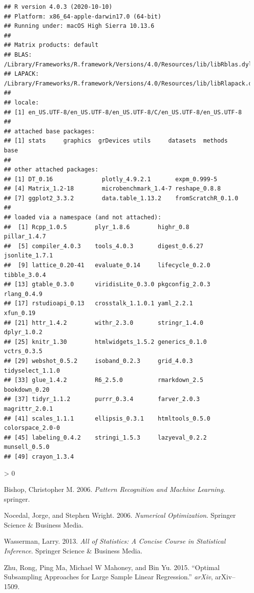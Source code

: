 \documentclass[
]{book}
\newlength{\cslhangindent}
\newenvironment{CSLReferences}[2] %
 {%
  \setlength{\parindent}{0pt}
  \ifodd #1 \everypar{\setlength{\hangindent}{\cslhangindent}}\ignorespaces\fi
  \ifnum #2 > 0
  \setlength{\parskip}{#2\baselineskip}
  \fi
 }%
 {}
\begin{document}
\begin{verbatim}
## R version 4.0.3 (2020-10-10)
## Platform: x86_64-apple-darwin17.0 (64-bit)
## Running under: macOS High Sierra 10.13.6
## 
## Matrix products: default
## BLAS:   /Library/Frameworks/R.framework/Versions/4.0/Resources/lib/libRblas.dylib
## LAPACK: /Library/Frameworks/R.framework/Versions/4.0/Resources/lib/libRlapack.dylib
## 
## locale:
## [1] en_US.UTF-8/en_US.UTF-8/en_US.UTF-8/C/en_US.UTF-8/en_US.UTF-8
## 
## attached base packages:
## [1] stats     graphics  grDevices utils     datasets  methods   base     
## 
## other attached packages:
## [1] DT_0.16              plotly_4.9.2.1       expm_0.999-5        
## [4] Matrix_1.2-18        microbenchmark_1.4-7 reshape_0.8.8       
## [7] ggplot2_3.3.2        data.table_1.13.2    fromScratchR_0.1.0  
## 
## loaded via a namespace (and not attached):
##  [1] Rcpp_1.0.5        plyr_1.8.6        highr_0.8         pillar_1.4.7     
##  [5] compiler_4.0.3    tools_4.0.3       digest_0.6.27     jsonlite_1.7.1   
##  [9] lattice_0.20-41   evaluate_0.14     lifecycle_0.2.0   tibble_3.0.4     
## [13] gtable_0.3.0      viridisLite_0.3.0 pkgconfig_2.0.3   rlang_0.4.9      
## [17] rstudioapi_0.13   crosstalk_1.1.0.1 yaml_2.2.1        xfun_0.19        
## [21] httr_1.4.2        withr_2.3.0       stringr_1.4.0     dplyr_1.0.2      
## [25] knitr_1.30        htmlwidgets_1.5.2 generics_0.1.0    vctrs_0.3.5      
## [29] webshot_0.5.2     isoband_0.2.3     grid_4.0.3        tidyselect_1.1.0 
## [33] glue_1.4.2        R6_2.5.0          rmarkdown_2.5     bookdown_0.20    
## [37] tidyr_1.1.2       purrr_0.3.4       farver_2.0.3      magrittr_2.0.1   
## [41] scales_1.1.1      ellipsis_0.3.1    htmltools_0.5.0   colorspace_2.0-0 
## [45] labeling_0.4.2    stringi_1.5.3     lazyeval_0.2.2    munsell_0.5.0    
## [49] crayon_1.3.4
\end{verbatim}

\hypertarget{refs}{}
\begin{CSLReferences}{1}{0}
\leavevmode\hypertarget{ref-bishop2006pattern}{}%
Bishop, Christopher M. 2006. \emph{Pattern Recognition and Machine Learning}. springer.

\leavevmode\hypertarget{ref-nw2006numerical}{}%
Nocedal, Jorge, and Stephen Wright. 2006. \emph{Numerical Optimization}. Springer Science \& Business Media.

\leavevmode\hypertarget{ref-wasserman2013all}{}%
Wasserman, Larry. 2013. \emph{All of Statistics: A Concise Course in Statistical Inference}. Springer Science \& Business Media.

\leavevmode\hypertarget{ref-zhu2015optimal}{}%
Zhu, Rong, Ping Ma, Michael W Mahoney, and Bin Yu. 2015. {``Optimal Subsampling Approaches for Large Sample Linear Regression.''} \emph{arXiv}, arXiv--1509.

\end{CSLReferences}
\end{document}
